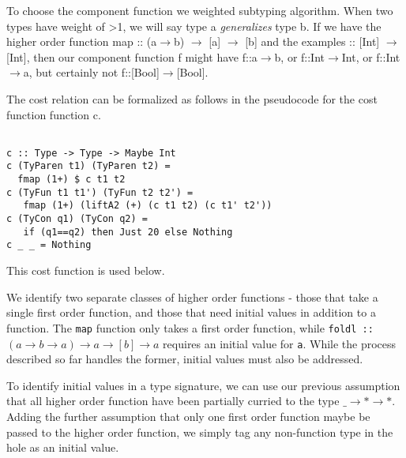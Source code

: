 


To choose the component function we weighted subtyping algorithm.
When two types have weight of >1, we will say type a \textit{generalizes} type b.
If we have the higher order function map :: (a$\to$b) $\to$ [a] $\to$ [b] and the examples :: [Int] $\to$ [Int], then our component function f might have f::a$\to$b, or f::Int$\to$Int, or f::Int$\to$a, but certainly not f::[Bool]$\to$[Bool].

The cost relation can be formalized as follows in the pseudocode for the cost function function c.
\begin{lstlisting}

c :: Type -> Type -> Maybe Int
c (TyParen t1) (TyParen t2) =
  fmap (1+) $ c t1 t2
c (TyFun t1 t1') (TyFun t2 t2') =
   fmap (1+) (liftA2 (+) (c t1 t2) (c t1' t2'))
c (TyCon q1) (TyCon q2) =
   if (q1==q2) then Just 20 else Nothing
c _ _ = Nothing

\end{lstlisting}

This cost function is used below.

We identify two separate classes of higher order functions - those that take a single first order function, and those that need initial values in addition to a function. The \texttt{map} function only takes a first order function, while \texttt{foldl :: $(a\to b\to a)\to a\to [b]\to a$} requires an initial value for \texttt{a}. While the process described so far handles the former, initial values must also be addressed.

To identify initial values in a type signature, we can use our previous assumption that all higher order function have been partially curried to the type \texttt{$\_\to *\to*$}. Adding the further assumption that only one first order function maybe be passed to the higher order function, we simply tag any non-function type in the hole as an initial value. 

